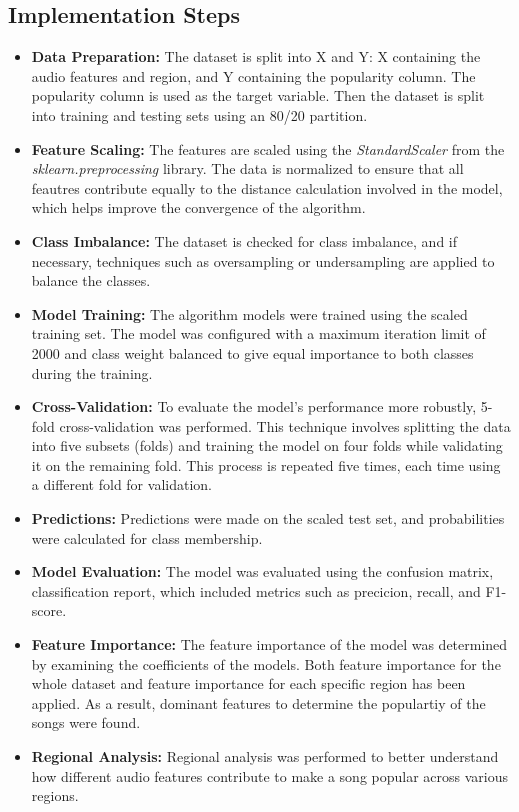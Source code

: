 \subsection{Implementation Steps}
\begin{itemize}
    \item \textbf{Data Preparation: } The dataset is split into X and Y: X containing the audio features and region, and Y containing the popularity column.
    The popularity column is used as the target variable. Then the dataset is split into training and testing sets using an 80/20 partition.
    \item \textbf{Feature Scaling: } The features are scaled using the \textit{StandardScaler} from the \textit{sklearn.preprocessing} library. The data is normalized to ensure that all feautres contribute equally to the distance calculation involved in the model, which helps improve the convergence of the algorithm.
    \item \textbf{Class Imbalance: } The dataset is checked for class imbalance, and if necessary, techniques such as oversampling or undersampling are applied to balance the classes.
  
    \item \textbf{Model Training: } The algorithm models were trained using the scaled training set. The model was
    configured with a maximum iteration limit of 2000 and class weight balanced to give equal importance to both classes during the training.
    \item \textbf{Cross-Validation: } To evaluate the model's performance more robustly, 5-fold cross-validation was performed.
    This technique involves splitting the data into five subsets (folds) and training the model on four folds while validating it on the remaining
    fold. This process is repeated five times, each time using a different fold for validation.
    \item \textbf{Predictions: } Predictions were made on the scaled test set, and probabilities were calculated for class membership. 
    \item \textbf{Model Evaluation: } The model was evaluated using the confusion matrix, classification report, which included metrics such as precicion, recall, and F1-score.
    \item \textbf{Feature Importance: } The feature importance of the model was determined by examining the coefficients of the models. Both feature importance for the whole dataset and feature importance for each specific region has been applied. As a result, dominant features to determine the populartiy of the songs were found.
    \item \textbf{Regional Analysis: } Regional analysis was performed to better understand how different audio features contribute to make a song popular across various regions.
\end{itemize} 


